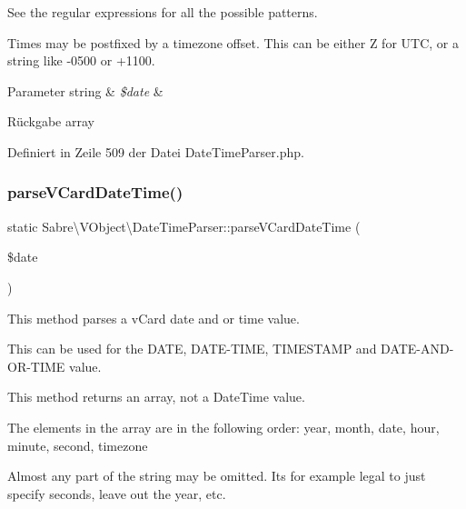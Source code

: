 See the regular expressions for all the possible patterns.

Times may be postfixed by a timezone offset. This can be either \textquotesingle{}Z\textquotesingle{} for U\+TC, or a string like -\/0500 or +1100.


\begin{DoxyParams}[1]{Parameter}
string & {\em \$date} & \\
\hline
\end{DoxyParams}
\begin{DoxyReturn}{Rückgabe}
array 
\end{DoxyReturn}


Definiert in Zeile 509 der Datei Date\+Time\+Parser.\+php.

\mbox{\label{class_sabre_1_1_v_object_1_1_date_time_parser_a0700bbb6a7298fe08e999b9948fb0e16}} 
\subsubsection{\texorpdfstring{parse\+V\+Card\+Date\+Time()}{parseVCardDateTime()}}
{\footnotesize\ttfamily static Sabre\textbackslash{}\+V\+Object\textbackslash{}\+Date\+Time\+Parser\+::parse\+V\+Card\+Date\+Time (\begin{DoxyParamCaption}\item[{}]{\$date }\end{DoxyParamCaption})\hspace{0.3cm}{\ttfamily [static]}}

This method parses a v\+Card date and or time value.

This can be used for the D\+A\+TE, D\+A\+T\+E-\/\+T\+I\+ME, T\+I\+M\+E\+S\+T\+A\+MP and D\+A\+T\+E-\/\+A\+N\+D-\/\+O\+R-\/\+T\+I\+ME value.

This method returns an array, not a Date\+Time value.

The elements in the array are in the following order\+: year, month, date, hour, minute, second, timezone

Almost any part of the string may be omitted. It\textquotesingle{}s for example legal to just specify seconds, leave out the year, etc.

